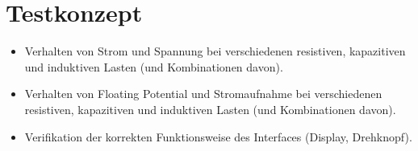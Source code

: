 \documentclass{article}
\begin{document}
\section{Testkonzept}

\begin{itemize}
    \item
        Verhalten  von  Strom  und   Spannung  bei  verschiedenen  resistiven,
        kapazitiven und induktiven Lasten (und Kombinationen davon).
    \item
        Verhalten von  Floating Potential und Stromaufnahme  bei verschiedenen
        resistiven,  kapazitiven  und  induktiven  Lasten  (und  Kombinationen
        davon).
    \item
        Verifikation  der korrekten  Funktionsweise  des Interfaces  (Display,
        Drehknopf).
\end{itemize}
\end{document}
